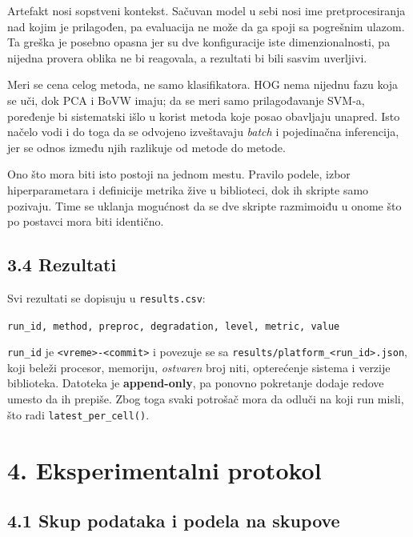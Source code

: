 \documentclass[11pt,a4paper]{article}
\begin{document}
Artefakt nosi sopstveni kontekst. Sačuvan model u sebi nosi ime pretprocesiranja nad
kojim je prilagođen, pa evaluacija ne može da ga spoji sa pogrešnim ulazom. Ta greška je posebno
opasna jer su dve konfiguracije iste dimenzionalnosti, pa nijedna provera oblika ne bi reagovala,
a rezultati bi bili sasvim uverljivi.

Meri se cena celog metoda, ne samo klasifikatora. HOG nema nijednu fazu koja se uči, dok
PCA i BoVW imaju; da se meri samo prilagođavanje SVM-a, poređenje bi sistematski išlo u korist
metoda koje posao obavljaju unapred. Isto načelo vodi i do toga da se odvojeno izveštavaju
\textit{batch} i pojedinačna inferencija, jer se odnos između njih razlikuje od metode do metode.

Ono što mora biti isto postoji na jednom mestu. Pravilo podele, izbor hiperparametara i
definicije metrika žive u biblioteci, dok ih skripte samo pozivaju. Time se uklanja
mogućnost da se dve skripte razmimoiđu u onome što po postavci mora biti identično.

\subsection*{3.4 Rezultati}

Svi rezultati se dopisuju u \texttt{results.csv}:

\begin{center}
\texttt{run\_id, method, preproc, degradation, level, metric, value}
\end{center}

\texttt{run\_id} je \texttt{<vreme>-<commit>} i povezuje se sa
\texttt{results/platform\_<run\_id>.json}, koji beleži procesor, memoriju, \emph{ostvaren} broj
niti, opterećenje sistema i verzije biblioteka. Datoteka je \textbf{append-only}, pa ponovno
pokretanje dodaje redove umesto da ih prepiše. Zbog toga svaki potrošač mora da odluči na koji
run misli, što radi \texttt{latest\_per\_cell()}.

\newpage

\section*{4. Eksperimentalni protokol}

\subsection*{4.1 Skup podataka i podela na skupove}
\end{document}
